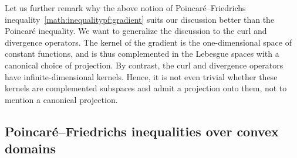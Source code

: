 \documentclass[10pt,letterpaper]{article}
\begin{document}
\begin{remark}
    Let us further remark why the above notion of Poincar\'e--Friedrichs inequality~\eqref{math:inequalitypf:gradient} suits our discussion better than the Poincar\'e inequality. 
    We want to generalize the discussion to the curl and divergence operators. 
    The kernel of the gradient is the one-dimensional space of constant functions, and is thus complemented in the Lebesgue spaces with a canonical choice of projection. 
    By contrast, the curl and divergence operators have infinite-dimensional kernels. 
    Hence, it is not even trivial whether these kernels are complemented subspaces and admit a projection onto them, not to mention a canonical projection. 
\end{remark}




\subsection{Poincar\'e--Friedrichs inequalities over convex domains}
\end{document}
